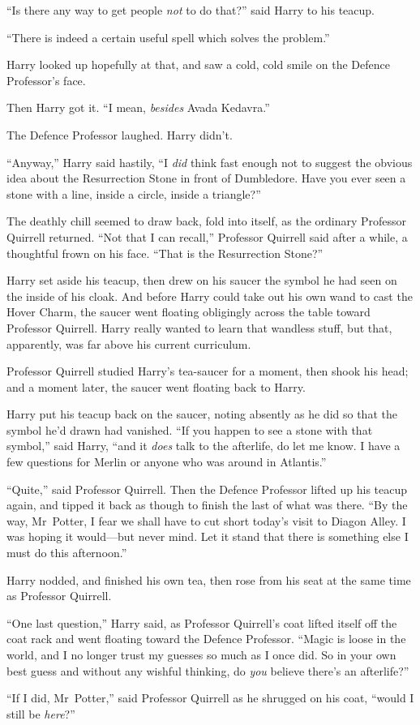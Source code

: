 “Is there any way to get people \emph{not} to do that?” said Harry to his teacup.

“There is indeed a certain useful spell which solves the problem.”

Harry looked up hopefully at that, and saw a cold, cold smile on the Defence Professor’s face.

Then Harry got it.
“I mean, \emph{besides} Avada Kedavra.”

The Defence Professor laughed. Harry didn’t.

“Anyway,” Harry said hastily,
“I \emph{did} think fast enough not to suggest the obvious idea about the Resurrection Stone in front of Dumbledore. Have you ever seen a stone with a line, inside a circle, inside a triangle?”

The deathly chill seemed to draw back, fold into itself, as the ordinary Professor Quirrell returned.
“Not that I can recall,” Professor Quirrell said after a while, a thoughtful frown on his face.
“That is the Resurrection Stone?”

Harry set aside his teacup, then drew on his saucer the symbol he had seen on the inside of his cloak. And before Harry could take out his own wand to cast the Hover Charm, the saucer went floating obligingly across the table toward Professor Quirrell. Harry really wanted to learn that wandless stuff, but that, apparently, was far above his current curriculum.

Professor Quirrell studied Harry’s tea-saucer for a moment, then shook his head; and a moment later, the saucer went floating back to Harry.

Harry put his teacup back on the saucer, noting absently as he did so that the symbol he’d drawn had vanished.
“If you happen to see a stone with that symbol,” said Harry, “and it \emph{does} talk to the afterlife, do let me know. I have a few questions for Merlin or anyone who was around in Atlantis.”

“Quite,” said Professor Quirrell. Then the Defence Professor lifted up his teacup again, and tipped it back as though to finish the last of what was there.
“By the way, Mr~Potter, I fear we shall have to cut short today’s visit to Diagon Alley. I was hoping it would—but never mind. Let it stand that there is something else I must do this afternoon.”

Harry nodded, and finished his own tea, then rose from his seat at the same time as Professor Quirrell.

“One last question,” Harry said, as Professor Quirrell’s coat lifted itself off the coat rack and went floating toward the Defence Professor.
“Magic is loose in the world, and I no longer trust my guesses so much as I once did. So in your own best guess and without any wishful thinking, do \emph{you} believe there’s an afterlife?”

“If I did, Mr~Potter,” said Professor Quirrell as he shrugged on his coat, “would I still be \emph{here}?”

